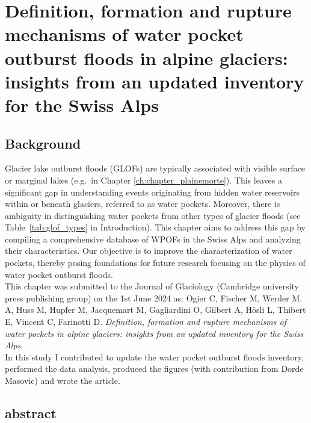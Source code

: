 \chapter{Definition, formation and rupture mechanisms of water pocket outburst floods in alpine glaciers: insights from an updated inventory for the Swiss Alps}
\label{ch:chapter_WPOFs}


\section{Background}

Glacier lake outburst floods (GLOFs) are typically associated with visible surface or marginal lakes (e.g.\ in Chapter \ref{ch:chapter_plainemorte}). This leaves a significant gap in understanding events originating from hidden water reservoirs within or beneath glaciers, referred to as water pockets. Moreover, there is ambiguity in distinguishing water pockets from other types of glacier floods (see Table~\ref{tab:glof_types} in Introduction). This chapter aims to address this gap by compiling a comprehensive database of WPOFs in the Swiss Alps and analyzing their characteristics. Our objective is to improve the characterization of water pockets, thereby posing foundations for future research focusing on the physics of water pocket outburst floods.\\
This chapter was submitted to the Journal of Glaciology (Cambridge university press publishing
group) on the 1st June 2024 as: Ogier C, Fischer M, Werder M. A, Huss M, Hupfer M, Jacquemart M, Gagliardini O, Gilbert A, Hösli L, Thibert E, Vincent C, Farinotti D. \textit{Definition, formation and rupture mechanisms of water pockets in alpine glaciers: insights from an updated inventory for the Swiss Alps}. \\
In this study I contributed to update the water pocket outburst floods inventory, performed the data analysis, produced the figures (with contribution from Dorde Masovic) and wrote the article. 


\section{abstract}

